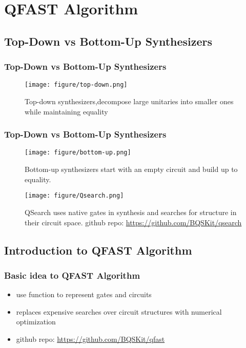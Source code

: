 \section{QFAST Algorithm}

\subsection{Top-Down vs Bottom-Up Synthesizers}
\begin{frame}
\frametitle{Top-Down vs Bottom-Up Synthesizers}
\begin{figure}
  \texttt{[image: figure/top-down.png]}
  \caption{Top-down synthesizers,decompose large unitaries into smaller ones while maintaining equality}
\end{figure}
\end{frame}
\begin{frame}
  \frametitle{Top-Down vs Bottom-Up Synthesizers}
  \begin{figure}
    \texttt{[image: figure/bottom-up.png]}
    \caption{Bottom-up synthesizers start with an empty circuit and build up to equality.}
  \end{figure}
  \begin{figure}
    \texttt{[image: figure/Qsearch.png]}
    \caption{QSearch uses native gates in synthesis and searches for structure in their circuit space. github repo: \url{https://github.com/BQSKit/qsearch}}
  \end{figure}
\end{frame}
\subsection{Introduction to QFAST Algorithm}
\begin{frame}
\frametitle{Basic idea to QFAST Algorithm\cite{QFAST}}
\begin{itemize}
  \item use function to represent gates and circuits
  \item replaces expensive searches over circuit structures with numerical optimization
  \item github repo: \url{https://github.com/BQSKit/qfast}
\end{itemize}
\end{frame}

